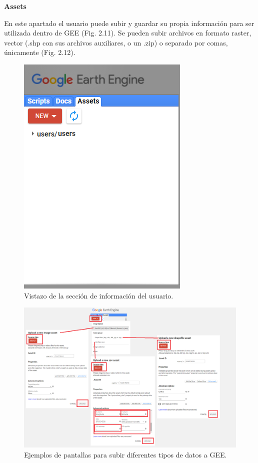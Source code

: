 \documentclass[
  12pt,
  letterpaper,
  twoside]{book}
\begin{document}
\textbf{Assets}

En este apartado el usuario puede subir y guardar su propia información para ser utilizada dentro de GEE (Fig. 2.11). Se pueden subir archivos en formato raster, vector (.shp con sus archivos auxiliares, o un .zip) o separado por comas, únicamente (Fig. 2.12).

\begin{figure}[btp]

{\centering \includegraphics[width=0.4\linewidth]{Img/assets} 

}

\caption{Vistazo de la sección de información del usuario.}\label{fig:unnamed-chunk-12}
\end{figure}

\begin{figure}[btp]

{\centering \includegraphics[width=1\linewidth]{Img/newAssets} 

}

\caption{Ejemplos de pantallas para subir diferentes tipos de datos a GEE.}\label{fig:unnamed-chunk-13}
\end{figure}
\end{document}
